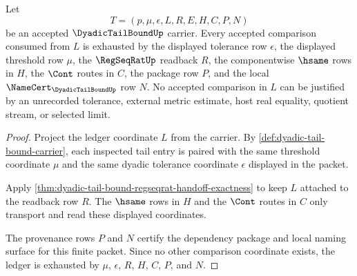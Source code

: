 \begin{theorem}
\label{thm:dyadic-tail-bound-tolerance-ledger-exhaustion}
Let
$$
T=(p,\mu,\epsilon,L,R,E,H,C,P,N)
$$
be an accepted $\DyadicTailBoundUp$ carrier. Every accepted comparison consumed from $L$ is exhausted by the displayed tolerance row $\epsilon$, the displayed threshold row $\mu$, the $\RegSeqRatUp$ readback $R$, the componentwise $\hsame$ rows in $H$, the $\Cont$ routes in $C$, the package row $P$, and the local $\NameCert_{\DyadicTailBoundUp}$ row $N$. No accepted comparison in $L$ can be justified by an unrecorded tolerance, external metric estimate, host real equality, quotient stream, or selected limit.
\end{theorem}
\begin{proof}
Project the ledger coordinate $L$ from the carrier. By \autoref{def:dyadic-tail-bound-carrier}, each inspected tail entry is paired with the same threshold coordinate $\mu$ and the same dyadic tolerance coordinate $\epsilon$ displayed in the packet.

Apply \autoref{thm:dyadic-tail-bound-regseqrat-handoff-exactness} to keep $L$ attached to the readback row $R$. The $\hsame$ rows in $H$ and the $\Cont$ routes in $C$ only transport and read these displayed coordinates.

The provenance rows $P$ and $N$ certify the dependency package and local naming surface for this finite packet. Since no other comparison coordinate exists, the ledger is exhausted by $\mu$, $\epsilon$, $R$, $H$, $C$, $P$, and $N$.
\end{proof}

